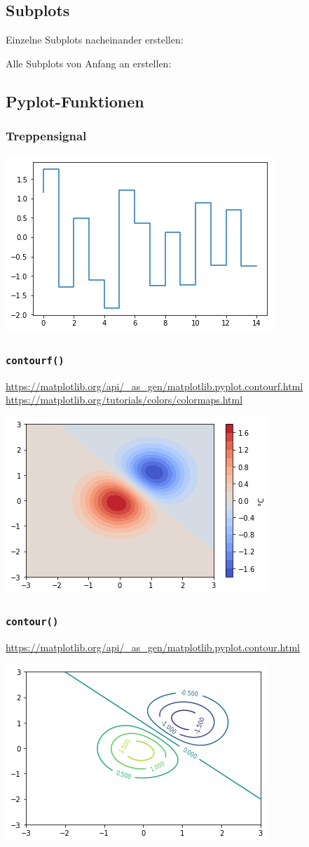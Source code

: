 \subsection{Subplots}
Einzelne Subplots nacheinander erstellen:

Alle Subplots von Anfang an erstellen:


\subsection{Pyplot-Funktionen}
\subsubsection{Treppensignal}

\includegraphics[width=0.4\linewidth]{images/v9_matplotlib1}

\subsubsection{\texttt{contourf()}}
\url{https://matplotlib.org/api/_as_gen/matplotlib.pyplot.contourf.html}\\
\url{https://matplotlib.org/tutorials/colors/colormaps.html}

\includegraphics[width=0.4\linewidth]{images/v9_matplotlib2}

\subsubsection{\texttt{contour()}}
\url{https://matplotlib.org/api/_as_gen/matplotlib.pyplot.contour.html}

\includegraphics[width=0.4\linewidth]{images/v9_matplotlib3}

